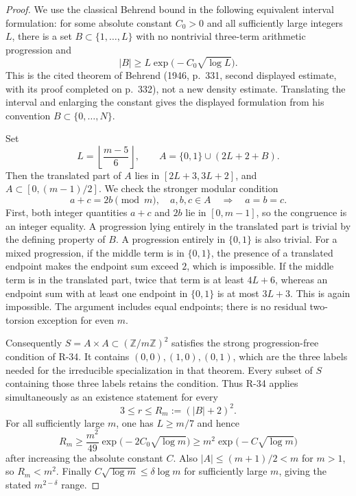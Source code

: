 \begin{proof}
We use the classical Behrend bound in the following equivalent
interval formulation: for some absolute constant $C_0>0$ and all
sufficiently large integers $L$, there is a set
$B\subset\{1,\ldots,L\}$ with no nontrivial three-term arithmetic
progression and
\[
                 |B|\geq L\exp\!\bigl(-C_0\sqrt{\log L}\bigr).
\]
This is the cited theorem of Behrend (1946, p.~331, second displayed
estimate, with its proof completed on p.~332), not a new density
estimate. Translating the interval and enlarging the constant gives
the displayed formulation from his convention $B\subset\{0,\ldots,N\}$.

Set
\[
 L=\left\lfloor\frac{m-5}{6}\right\rfloor,
 \qquad A=\{0,1\}\cup(2L+2+B).
\]
Then the translated part of $A$ lies in
$[2L+3,3L+2]$, and $A\subset[0,(m-1)/2]$. We check the stronger
modular condition
\[
 a+c=2b\pmod m,\quad a,b,c\in A
                 \quad\Longrightarrow\quad a=b=c.
\]
First, both integer quantities $a+c$ and $2b$ lie in $[0,m-1]$,
so the congruence is an integer equality. A progression lying
entirely in the translated part is trivial by the defining property
of $B$. A progression entirely in $\{0,1\}$ is also trivial.
For a mixed progression, if the middle term is in $\{0,1\}$, the
presence of a translated endpoint makes the endpoint sum exceed
$2$, which is impossible. If the middle term is in the translated
part, twice that term is at least $4L+6$, whereas an endpoint sum
with at least one endpoint in $\{0,1\}$ is at most $3L+3$.
This is again impossible. The argument includes equal endpoints;
there is no residual two-torsion exception for even $m$.

Consequently $S=A\times A\subset(\mathbb Z/m\mathbb Z)^2$
satisfies the strong progression-free condition of R-34. It contains
$(0,0),(1,0),(0,1)$, which are the three labels needed for the
irreducible specialization in that theorem. Every subset of $S$
containing those three labels retains the condition. Thus R-34
applies simultaneously as an existence statement for every
\[
                    3\leq r\leq R_m:=(|B|+2)^2.
\]
For all sufficiently large $m$, one has $L\geq m/7$ and hence
\[
 R_m\geq \frac{m^2}{49}
                \exp\!\bigl(-2C_0\sqrt{\log m}\bigr)
       \geq m^2\exp\!\bigl(-C\sqrt{\log m}\bigr)
\]
after increasing the absolute constant $C$. Also
$|A|\leq (m+1)/2<m$ for $m>1$, so $R_m<m^2$.
Finally $C\sqrt{\log m}\leq\delta\log m$ for sufficiently
large $m$, giving the stated $m^{2-\delta}$ range.
\end{proof}

